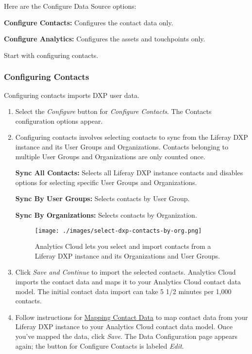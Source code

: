 Here are the Configure Data Source options:

\textbf{Configure Contacts:} Configures the contact data only.

\textbf{Configure Analytics:} Configures the assets and touchpoints
only.

Start with configuring contacts.

\subsubsection{Configuring Contacts}\label{configuring-contacts}

Configuring contacts imports DXP user data.

\begin{enumerate}
\def\labelenumi{\arabic{enumi}.}
\item
  Select the \emph{Configure} button for \emph{Configure Contacts}. The
  Contacts configuration options appear.
\item
  Configuring contacts involves selecting contacts to sync from the
  Liferay DXP instance and its User Groups and Organizations. Contacts
  belonging to multiple User Groups and Organizations are only counted
  once.

  \textbf{Sync All Contacts:} Selects all Liferay DXP instance contacts
  and disables options for selecting specific User Groups and
  Organizations.

  \textbf{Sync By User Groups:} Selects contacts by User Group.

  \textbf{Sync By Organizations:} Selects contacts by Organization.

  \begin{figure}
  \centering
  \texttt{[image: ./images/select-dxp-contacts-by-org.png]}
  \caption{Analytics Cloud lets you select and import contacts from a
  Liferay DXP instance and its Organizations and User Groups.}
  \end{figure}
\item
  Click \emph{Save and Continue} to import the selected contacts.
  Analytics Cloud imports the contact data and maps it to your Analytics
  Cloud contact data model. The initial contact data import can take 5
  1/2 minutes per 1,000 contacts.
\item
  Follow instructions for
  \href{https://github.com/liferay/liferay-docs/blob/7.1.x/discover/analytics-cloud/articles/02-getting-started/04-mapping-contact-data.markdown}{Mapping
  Contact Data} to map contact data from your Liferay DXP instance to
  your Analytics Cloud contact data model. Once you've mapped the data,
  click \emph{Save}. The Data Configuration page appears again; the
  button for Configure Contacts is labeled \emph{Edit}.
\end{enumerate}

